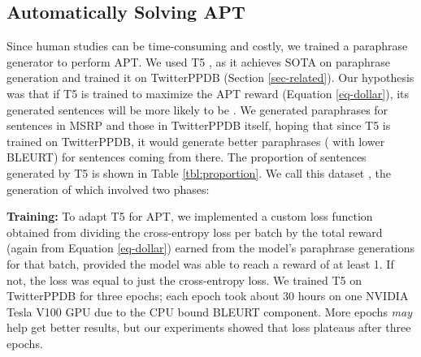 \subsection{Automatically Solving APT}
\label{section-nap}

Since human studies can be time-consuming and costly, we trained a paraphrase generator to perform APT. We used T5 \cite{raffel2020exploring}, as it achieves SOTA on paraphrase generation \cite{niu2020unsupervised, bird2020chatbot, li2020agent} and trained it on TwitterPPDB (Section \ref{sec-related}). Our hypothesis was that if T5 is trained to maximize the APT reward (Equation \ref{eq-dollar}), its generated sentences will be more likely to be . We generated paraphrases for sentences in MSRP and those in TwitterPPDB itself, hoping that since T5 is trained on TwitterPPDB, it would generate better paraphrases ( with lower BLEURT) for sentences coming from there. The proportion of sentences generated by T5 is shown in Table \ref{tbl:proportion}. We call this dataset , the generation of which involved two phases:

\noindent \textbf{Training:} To adapt T5 for APT, we implemented a custom loss function obtained from dividing the cross-entropy loss per batch by the total reward (again from Equation \ref{eq-dollar}) earned from the model's paraphrase generations for that batch, provided the model was able to reach a reward of at least 1. If not, the loss was equal to just the cross-entropy loss. We trained T5 on TwitterPPDB
for three epochs; each epoch took about 30 hours on one NVIDIA Tesla V100 GPU due to the CPU bound BLEURT component. More epochs \textit{may} help get better results, but our experiments showed that loss plateaus after three epochs.

